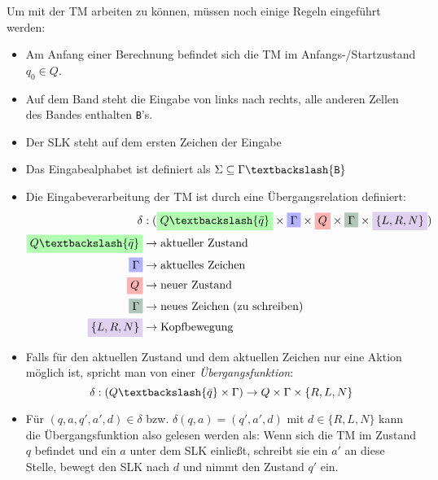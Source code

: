 \documentclass{scrartcl}%
\begin{document}
    \vspace*{0.3cm}
    Um mit der TM arbeiten zu können, müssen noch einige Regeln eingeführt werden:
    \begin{itemize}
        \item Am Anfang einer Berechnung befindet sich die TM im Anfangs-/Startzustand $q_0 \in Q$.
        \item Auf dem Band steht die Eingabe von links nach rechts,
        alle anderen Zellen des Bandes enthalten \texttt{B}'s.
        \item Der SLK steht auf dem ersten Zeichen der Eingabe
        \item Das Eingabealphabet ist definiert als $\Sigma \subseteq \Gamma \textbackslash \{\texttt{B}\}$
        \item Die Eingabeverarbeitung der TM ist durch eine Übergangsrelation definiert:
        \begin{equation*}
            \begin{align}
                \delta & :(
                \colorbox{green!30}{$Q \textbackslash \{ \bar{q} \}$} \times
                \colorbox{blue!30}{$\Gamma$} \times
                \colorbox{red!30}{$Q$} \times
                \colorbox{upforestgreen!30}{$\Gamma$} \times
                \colorbox{amethyst!30}{$\{L,R,N\}$}) \\
                \colorbox{green!30}{$Q \textbackslash \{ \bar{q} \}$} & \rightarrow \text{aktueller Zustand} \\
                \colorbox{blue!30}{$\Gamma$} & \rightarrow \text{aktuelles Zeichen} \\
                \colorbox{red!30}{$Q$} & \rightarrow \text{neuer Zustand} \\
                \colorbox{upforestgreen!30}{$\Gamma$} & \rightarrow \text{neues Zeichen (zu schreiben)} \\
                \colorbox{amethyst!30}{$\{L,R,N\}$} & \rightarrow \text{Kopfbewegung} \\
            \end{align}
        \end{equation*}
        \item [] Falls für den aktuellen Zustand und dem aktuellen Zeichen nur eine Aktion möglich ist,
        spricht man von einer \textit{Übergangsfunktion}:
        \begin{equation*}
            \delta : (Q \textbackslash \{ \bar{q} \} \times \Gamma) \rightarrow Q \times \Gamma \times \{ R,L,N\}
        \end{equation*}
        \item [] Für $(q,a,q',a',d) \in \delta$ bzw. $\delta (q,a) = (q', a', d)$ mit $d \in \{R,L,N\}$
        kann die Übergangsfunktion also gelesen werden als: Wenn sich die TM im Zustand $q$ befindet und ein $a$ unter dem SLK einließt,
        schreibt sie ein $a'$ an diese Stelle, bewegt den SLK nach $d$ und nimmt den Zustand $q'$ ein.
    \end{itemize}
\end{document}
